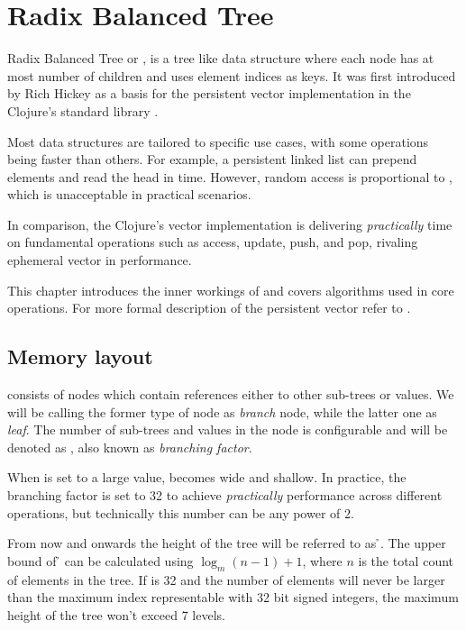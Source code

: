\chapter{Radix Balanced Tree}

Radix Balanced Tree or \emph{\rbtree}, is a tree like data structure where each node has at most \m{} number of children and uses element indices as keys. It was first introduced by Rich Hickey as a basis for the persistent vector implementation in the Clojure's standard library \cite{the-clojure-programming-language}. 

Most data structures are tailored to specific use cases, with some operations being faster than others. For example, a persistent linked list can prepend elements and read the head in  time. However, random access is proportional to , which is unacceptable in practical scenarios. 

In comparison, the Clojure's vector implementation is delivering \emph{practically}  time on fundamental operations such as access, update, push, and pop, rivaling ephemeral vector in performance.

This chapter introduces the inner workings of \rbtree{} and covers algorithms used in core operations. For more formal description of the persistent vector refer to \cite{improving-performance-through-transience}. 

\section{Memory layout}
\label{sec:rb-tree-memory-layout}

\rbtree{} consists of nodes which contain references either to other sub-trees or values. We will be calling the former type of node as \emph{branch} node, while the latter one as \emph{leaf}. The number of sub-trees and values in the node is configurable and will be denoted as \m{}, also known as \emph{branching factor}. 

When \m{} is set to a large value, \rbtree{} becomes wide and shallow. In practice, the branching factor is set to 32 to achieve \emph{practically}  performance across different operations, but technically this number can be any power of 2.

From now and onwards the height of the tree will be referred to as \h{}. The upper bound of \h{} can be calculated using ${\log_m(n - 1) + 1}$, where $n$ is the total count of elements in the tree. If \m{} is 32 and the number of elements will never be larger than the maximum index representable with 32 bit signed integers, the maximum height of the tree won't exceed 7 levels. 

